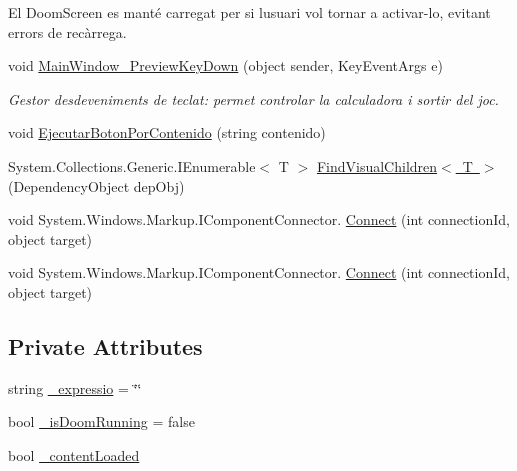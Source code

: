 \begin{DoxyCompactItemize}
\begin{DoxyCompactList}
El Doom\+Screen es manté carregat per si l\textquotesingle{}usuari vol tornar a activar-\/lo, evitant errors de recàrrega. \end{DoxyCompactList}\item 
void \mbox{\hyperlink{class_p_a_c4___calculadora_1_1_main_window_a3209540a4b7763138f82d9311887f17e}{Main\+Window\+\_\+\+Preview\+Key\+Down}} (object sender, Key\+Event\+Args e)
\begin{DoxyCompactList}\small\item\em Gestor d\textquotesingle{}esdeveniments de teclat\+: permet controlar la calculadora i sortir del joc. \end{DoxyCompactList}\item 
void \mbox{\hyperlink{class_p_a_c4___calculadora_1_1_main_window_accd06121801821a3d11500cc79293ff7}{Ejecutar\+Boton\+Por\+Contenido}} (string contenido)
\item 
System.\+Collections.\+Generic.\+I\+Enumerable$<$ T $>$ \mbox{\hyperlink{class_p_a_c4___calculadora_1_1_main_window_a6c67cf368bc6cddc47d21def635bb27b}{Find\+Visual\+Children$<$ T $>$}} (Dependency\+Object dep\+Obj)
\item 
void System.\+Windows.\+Markup.\+I\+Component\+Connector. \mbox{\hyperlink{class_p_a_c4___calculadora_1_1_main_window_afce5a132393509f37c5ad1a7654e9a8c}{Connect}} (int connection\+Id, object target)
\item 
void System.\+Windows.\+Markup.\+I\+Component\+Connector. \mbox{\hyperlink{class_p_a_c4___calculadora_1_1_main_window_afce5a132393509f37c5ad1a7654e9a8c}{Connect}} (int connection\+Id, object target)
\end{DoxyCompactItemize}
\subsection*{Private Attributes}
\begin{DoxyCompactItemize}
\item 
string \mbox{\hyperlink{class_p_a_c4___calculadora_1_1_main_window_aaff86064b24f88922e2ad0c931fbb5eb}{\+\_\+expressio}} = \char`\"{}\char`\"{}
\item 
bool \mbox{\hyperlink{class_p_a_c4___calculadora_1_1_main_window_a8edb84cff8d4d0c9e105264681e963f2}{\+\_\+is\+Doom\+Running}} = false
\item 
bool \mbox{\hyperlink{class_p_a_c4___calculadora_1_1_main_window_ab293ddad8561dff173549c5de0c639e3}{\+\_\+content\+Loaded}}
\end{DoxyCompactItemize}


